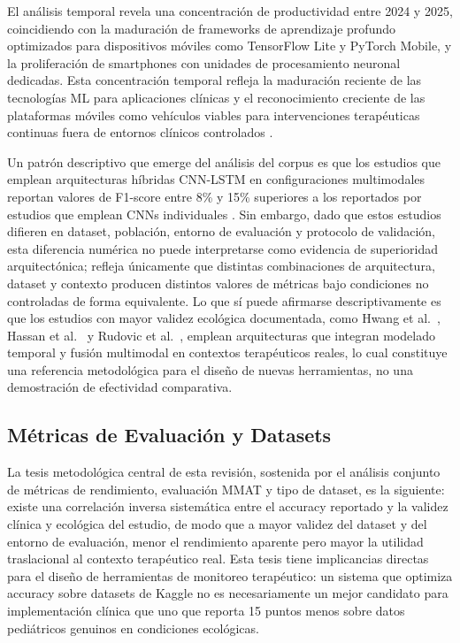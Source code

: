 \documentclass[3p,twocolumn,times]{elsarticle}
\begin{document}
	El análisis temporal revela una concentración de productividad entre 2024 y 2025,
	coincidiendo con la maduración de frameworks de aprendizaje profundo optimizados
	para dispositivos móviles como TensorFlow Lite y PyTorch Mobile, y la proliferación
	de smartphones con unidades de procesamiento neuronal dedicadas. Esta concentración
	temporal refleja la maduración reciente de las tecnologías ML para aplicaciones
	clínicas y el reconocimiento creciente de las plataformas móviles como vehículos
	viables para intervenciones terapéuticas continuas fuera de entornos clínicos
	controlados \cite{Levy2024}.
	
	Un patrón descriptivo que emerge del análisis del corpus es que los estudios que
	emplean arquitecturas híbridas CNN-LSTM en configuraciones multimodales reportan
	valores de F1-score entre 8\% y 15\% superiores a los reportados por estudios que
	emplean CNNs individuales \cite{Rhatassi2025,Rudovic2019}. Sin embargo, dado que
	estos estudios difieren en dataset, población, entorno de evaluación y protocolo
	de validación, esta diferencia numérica no puede interpretarse como evidencia de
	superioridad arquitectónica; refleja únicamente que distintas combinaciones de
	arquitectura, dataset y contexto producen distintos valores de métricas bajo
	condiciones no controladas de forma equivalente. Lo que sí puede afirmarse
	descriptivamente es que los estudios con mayor validez ecológica documentada, como
	Hwang et al.\ \cite{Hwang2024}, Hassan et al.\ \cite{Hassan2025} y Rudovic et al.\
	\cite{Rudovic2019}, emplean arquitecturas que integran modelado temporal y fusión
	multimodal en contextos terapéuticos reales, lo cual constituye una referencia
	metodológica para el diseño de nuevas herramientas, no una demostración de
	efectividad comparativa.
	
	\subsection{Métricas de Evaluación y Datasets}\label{sec6b}
	
	La tesis metodológica central de esta revisión, sostenida por el análisis conjunto
	de métricas de rendimiento, evaluación MMAT y tipo de dataset, es la siguiente:
	existe una correlación inversa sistemática entre el accuracy reportado y la validez
	clínica y ecológica del estudio, de modo que a mayor validez del dataset y del
	entorno de evaluación, menor el rendimiento aparente pero mayor la utilidad
	traslacional al contexto terapéutico real. Esta tesis tiene implicancias directas
	para el diseño de herramientas de monitoreo terapéutico: un sistema que optimiza
	accuracy sobre datasets de Kaggle no es necesariamente un mejor candidato para
	implementación clínica que uno que reporta 15 puntos menos sobre datos pediátricos
	genuinos en condiciones ecológicas.
	
\end{document}

